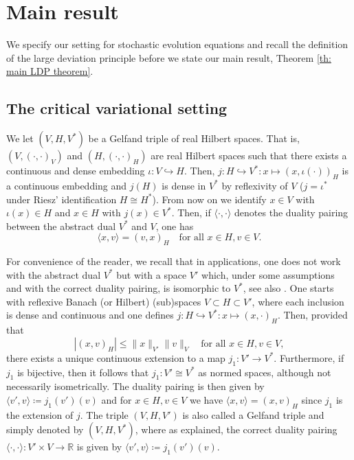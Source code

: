 \documentclass{amsart}
\newcommand{\<}{\langle}
\newcommand{\?}{\rangle}
\newcommand{\into}{\hookrightarrow}
\theoremstyle{plain}
\theoremstyle{remark}
\theoremstyle{plain}
\numberwithin{equation}{section}
\def\R{{\mathbb R}}
\begin{document}
\section{Main result}\label{sec: Main result}

We specify our setting for stochastic evolution equations  and recall the definition of the large deviation principle before we state our main result, Theorem \ref{th: main LDP theorem}.

\subsection{The critical variational setting}

We let $(V,H,V^*)$ be a Gelfand triple of real Hilbert spaces. That is, $(V,(\cdot,\cdot)_V)$ and $(H,(\cdot,\cdot)_H)$ are real Hilbert spaces such that there exists a continuous and dense embedding $\iota\colon V\into H$. Then, $j\colon H\into V^*\colon x\mapsto (x, \iota(\cdot))_H$ is a continuous embedding and $j(H)$ is dense in $V^*$ by reflexivity of $V$ ($j=\iota^*$ under Riesz' identification $H\cong H^*$). From now on we identify  $x\in V$ with $\iota(x)\in H$ and $x\in H$ with $j(x)\in V^*$. Then, if $\<\cdot,\cdot\?$ denotes the duality pairing between the abstract dual $V^*$ and $V$, one has
\[
\<x,v\?=(v,x)_H \quad\text{for all } x\in H, v\in V.
\]

For convenience of the reader, we recall that in applications, one does not work with the abstract dual $V^*$ but with a space $V'$ which, under some assumptions and with the correct duality pairing, is isomorphic to $V^*$, see also \cite[p. 1244]{krylov81}. One starts with reflexive Banach (or Hilbert) (sub)spaces $V\subset H\subset V'$, where each inclusion is dense and continuous and one defines $j\colon H\into V^*\colon x\mapsto (x, \cdot)_H$. Then, provided that
\begin{equation}\label{eq: j continuous}
|(x,v)_H|\leq \|x\|_{V'}\|v\|_V \quad\text{for all }x\in H, v\in V,
\end{equation}
there exists a unique continuous extension to a map $j_1\colon V'\to V^*$.  Furthermore, if $j_1$ is bijective, then it follows that $j_1\colon V'\cong V^*$ as normed spaces, although not necessarily isometrically. The duality pairing is then given by $\<v',v\?\coloneqq j_1(v')(v)$ and for $x\in H,v\in V$ we have $\<x,v\?=(x,v)_H$ since $j_1$ is the extension of $j$. The triple $(V,H,V')$ is also called a Gelfand triple and simply denoted by $(V,H,V^*)$, where as explained, the correct duality pairing $\<\cdot,\cdot\?\colon V'\times V\to \R$ is given by $\<v',v\?\coloneqq j_1(v')(v)$.
\end{document}
